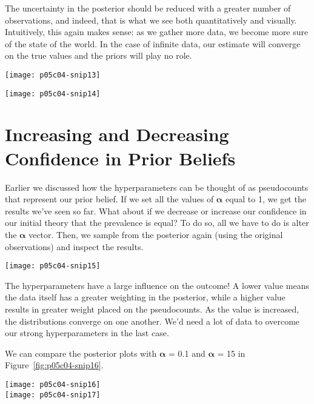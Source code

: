The uncertainty in the posterior should be reduced with a greater number of observations, and indeed, that is what we see both quantitatively and visually. Intuitively, this again makes sense: as we gather more data, we become more sure of the state of the world. In the case of infinite data, our estimate will converge on the true values and the priors will play no role.

\begin{figure*}[h]
    \texttt{[image: p05c04-snip13]}
\end{figure*}
\begin{figure*}[h]
    \texttt{[image: p05c04-snip14]}
    \caption{Posteriors with more data}
\end{figure*}


\section{Increasing and Decreasing Confidence in Prior Beliefs}

Earlier we discussed how the hyperparameters can be thought of as pseudocounts that represent our prior belief. If we set all the values of $\bm \alpha$ equal to 1, we get the results we've seen so far. What about if we decrease or increase our confidence in our initial theory that the prevalence is equal? To do so, all we have to do is alter the $\boldsymbol {\alpha }$ vector. Then, we sample from the posterior again (using the original observations) and inspect the results.

\begin{figure*}[h]
    \texttt{[image: p05c04-snip15]}
\end{figure*}



The hyperparameters have a large influence on the outcome! A lower value means the data itself has a greater weighting in the posterior, while a higher value results in greater weight placed on the pseudocounts. As the value is increased, the distributions converge on one another. We'd need a lot of data to overcome our strong hyperparameters in the last case.

We can compare the posterior plots with $\bm \alpha$ = 0.1 and $\bm \alpha$ = 15 in Figure~\ref{fig:p05c04-snip16}.


\begin{figure*}[h]
    \texttt{[image: p05c04-snip16]}\\
    \texttt{[image: p05c04-snip17]}
    \caption{Posterior plots with different $\bm \alpha$ }
    \label{fig:p05c04-snip16}
\end{figure*}


